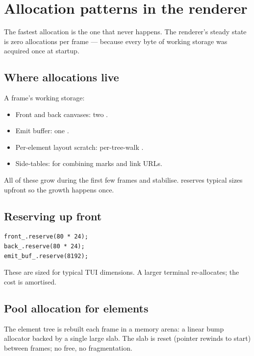 \chapter{Allocation patterns in the renderer}
\label{ch:allocations}

\begin{aside}
The fastest allocation is the one that never happens. The
renderer's steady state is zero allocations per frame ---
because every byte of working storage was acquired once at
startup.
\end{aside}

\section{Where allocations live}

A frame's working storage:

\begin{itemize}[leftmargin=*]
  \item Front and back canvases: two .
  \item Emit buffer: one .
  \item Per-element layout scratch: per-tree-walk
    .
  \item Side-tables:  for combining
    marks and link URLs.
\end{itemize}

All of these grow during the first few frames and stabilise.
\maya{} reserves typical sizes upfront so the growth happens
once.

\section{Reserving up front}

\begin{lstlisting}
front_.reserve(80 * 24);
back_.reserve(80 * 24);
emit_buf_.reserve(8192);
\end{lstlisting}

These are sized for typical TUI dimensions. A larger terminal
re-allocates; the cost is amortised.

\section{Pool allocation for elements}

The element tree is rebuilt each frame in a memory arena: a
linear bump allocator backed by a single large slab. The
slab is reset (pointer rewinds to start) between frames; no
free, no fragmentation.

